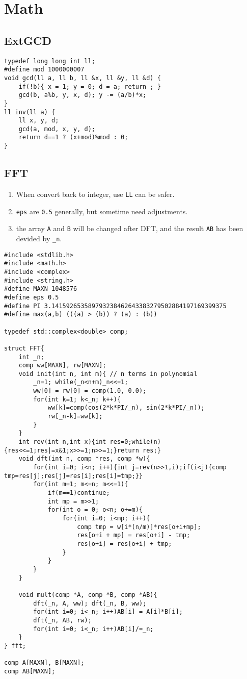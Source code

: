\section{Math}
\subsection{ExtGCD}
\begin{lstlisting}
typedef long long int ll;
#define mod 1000000007
void gcd(ll a, ll b, ll &x, ll &y, ll &d) {
	if(!b){ x = 1; y = 0; d = a; return ; }
	gcd(b, a%b, y, x, d); y -= (a/b)*x;
}
ll inv(ll a) {
	ll x, y, d;
	gcd(a, mod, x, y, d);
	return d==1 ? (x+mod)%mod : 0;
}
\end{lstlisting}
\subsection{FFT}
\begin{enumerate}
\itemsep-0.5em
\item When convert back to integer, use \lstinline{LL} can be safer.
\item \lstinline{eps} are \lstinline{0.5} generally, but sometime need adjustments.
\item the array \lstinline{A} and \lstinline{B} will be changed after DFT, and the result \lstinline{AB} has been devided by \lstinline{_n}.
\end{enumerate}
\begin{lstlisting}
#include <stdlib.h>
#include <math.h>
#include <complex>
#include <string.h>
#define MAXN 1048576
#define eps 0.5
#define PI 3.141592653589793238462643383279502884197169399375
#define max(a,b) (((a) > (b)) ? (a) : (b))

typedef std::complex<double> comp;

struct FFT{
	int _n;
	comp ww[MAXN], rw[MAXN];
	void init(int n, int m){ // n terms in polynomial
		_n=1; while(_n<n+m)_n<<=1;
		ww[0] = rw[0] = comp(1.0, 0.0);
		for(int k=1; k<_n; k++){
			ww[k]=comp(cos(2*k*PI/_n), sin(2*k*PI/_n));
			rw[_n-k]=ww[k];
		}
	}
	int rev(int n,int x){int res=0;while(n){res<<=1;res|=x&1;x>>=1;n>>=1;}return res;}
	void dft(int n, comp *res, comp *w){
		for(int i=0; i<n; i++){int j=rev(n>>1,i);if(i<j){comp tmp=res[j];res[j]=res[i];res[i]=tmp;}}
		for(int m=1; m<=n; m<<=1){ 
			if(m==1)continue;
			int mp = m>>1;
			for(int o = 0; o<n; o+=m){
				for(int i=0; i<mp; i++){
					comp tmp = w[i*(n/m)]*res[o+i+mp];
					res[o+i + mp] = res[o+i] - tmp;
					res[o+i] = res[o+i] + tmp;
				}
			}
		}
	}

	void mult(comp *A, comp *B, comp *AB){
		dft(_n, A, ww); dft(_n, B, ww);
		for(int i=0; i<_n; i++)AB[i] = A[i]*B[i];
		dft(_n, AB, rw);
		for(int i=0; i<_n; i++)AB[i]/=_n;
	}
} fft;

comp A[MAXN], B[MAXN];
comp AB[MAXN];
\end{lstlisting}
